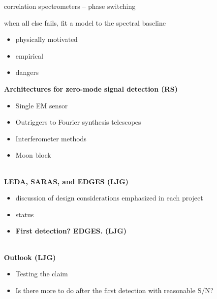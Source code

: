 correlation spectrometers -- phase switching

when all else fails, fit a model to the spectral baseline

\begin{itemize}
\item
  physically motivated
\item
  empirical
\item
  dangers
\end{itemize}

\textbf{Architectures for zero-mode signal detection (RS)}

\begin{itemize}
\item
  Single EM sensor
\item
  Outriggers to Fourier synthesis telescopes
\item
  Interferometer methods
\item
  Moon block
\end{itemize}

\emph{}\\

\textbf{LEDA, SARAS, and EDGES (LJG)}

\begin{itemize}
\item
  discussion of design considerations emphasized in each project
\item
  status
\end{itemize}

\begin{itemize}
\item
  \textbf{First detection? EDGES. (LJG)}
\end{itemize}

\textbf{}\\

\textbf{Outlook (LJG)}

\begin{itemize}
\item
  Testing the claim
\item
  Is there more to do after the first detection with reasonable S/N?
\end{itemize}







